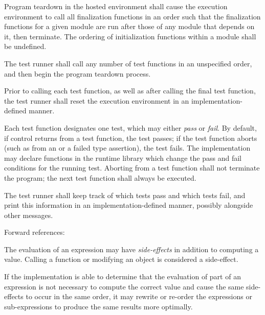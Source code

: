 \specsubsubitem
Program teardown in the hosted environment shall cause the execution environment
to call all finalization functions in an order such that the finalization
functions for a given module are run after those of any module that depends on
it, then terminate. The ordering of initialization functions within a module
shall be undefined.

\specsubsubitem
The test runner shall call any number of test functions in an unspecified order,
and then begin the program teardown process.


\specsubsubitem
Prior to calling each test function, as well as after calling the final test
function, the test runner shall reset the execution environment in an
implementation-defined manner.


\specsubsubitem
Each test function designates one test, which may either \textit{pass} or
\textit{fail}. By default, if control returns from a test function, the test
passes; if the test function aborts (such as from an
 or a failed type assertion), the test fails.
The implementation may declare functions in the runtime library which change the
pass and fail conditions for the running test. Aborting from a test function
shall not terminate the program; the next test function shall always be
executed.

\specsubsubitem
The test runner shall keep track of which tests pass and which tests fail, and
print this information in an implementation-defined manner, possibly alongside
other messages.

Forward references: 


\specsubsubitem
The evaluation of an expression may have \textit{side-effects} in addition to
computing a value. Calling a function or modifying an object is considered a
side-effect.

\specsubsubitem
If the implementation is able to determine that the evaluation of part of an
expression is not necessary to compute the correct value and cause the same
side-effects to occur in the same order, it may rewrite or re-order the
expressions or sub-expressions to produce the same results more optimally.

